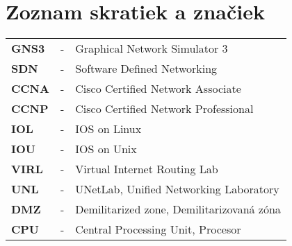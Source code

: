 \chapter*{Zoznam skratiek a značiek}

\begin{longtabu} to \textwidth {X[0.5,l] X[0.2,c] X[5,l]}
    \textbf{GNS3} & - & Graphical Network Simulator 3 \\
    \textbf{SDN} & - & Software Defined Networking \\
    \textbf{CCNA} & - & Cisco Certified Network Associate \\
    \textbf{CCNP} & - & Cisco Certified Network Professional \\
    \textbf{IOL} & - & IOS on Linux \\
    \textbf{IOU} & - & IOS on Unix \\
    \textbf{VIRL} & - & Virtual Internet Routing Lab \\
    \textbf{UNL} & - & UNetLab, Unified Networking Laboratory \\
    \textbf{DMZ} & - & Demilitarized zone, Demilitarizovaná zóna \\
    \textbf{CPU} & - & Central Processing Unit, Procesor \\
\end{longtabu}